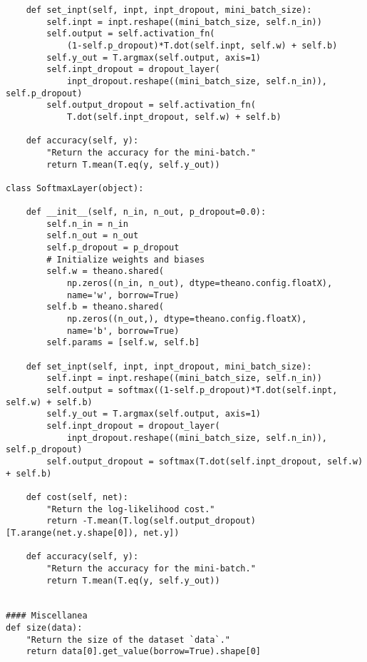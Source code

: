 \begin{lstlisting}
    def set_inpt(self, inpt, inpt_dropout, mini_batch_size):
        self.inpt = inpt.reshape((mini_batch_size, self.n_in))
        self.output = self.activation_fn(
            (1-self.p_dropout)*T.dot(self.inpt, self.w) + self.b)
        self.y_out = T.argmax(self.output, axis=1)
        self.inpt_dropout = dropout_layer(
            inpt_dropout.reshape((mini_batch_size, self.n_in)), self.p_dropout)
        self.output_dropout = self.activation_fn(
            T.dot(self.inpt_dropout, self.w) + self.b)

    def accuracy(self, y):
        "Return the accuracy for the mini-batch."
        return T.mean(T.eq(y, self.y_out))

class SoftmaxLayer(object):

    def __init__(self, n_in, n_out, p_dropout=0.0):
        self.n_in = n_in
        self.n_out = n_out
        self.p_dropout = p_dropout
        # Initialize weights and biases
        self.w = theano.shared(
            np.zeros((n_in, n_out), dtype=theano.config.floatX),
            name='w', borrow=True)
        self.b = theano.shared(
            np.zeros((n_out,), dtype=theano.config.floatX),
            name='b', borrow=True)
        self.params = [self.w, self.b]

    def set_inpt(self, inpt, inpt_dropout, mini_batch_size):
        self.inpt = inpt.reshape((mini_batch_size, self.n_in))
        self.output = softmax((1-self.p_dropout)*T.dot(self.inpt, self.w) + self.b)
        self.y_out = T.argmax(self.output, axis=1)
        self.inpt_dropout = dropout_layer(
            inpt_dropout.reshape((mini_batch_size, self.n_in)), self.p_dropout)
        self.output_dropout = softmax(T.dot(self.inpt_dropout, self.w) + self.b)

    def cost(self, net):
        "Return the log-likelihood cost."
        return -T.mean(T.log(self.output_dropout)[T.arange(net.y.shape[0]), net.y])

    def accuracy(self, y):
        "Return the accuracy for the mini-batch."
        return T.mean(T.eq(y, self.y_out))


#### Miscellanea
def size(data):
    "Return the size of the dataset `data`."
    return data[0].get_value(borrow=True).shape[0]


\end{lstlisting}
